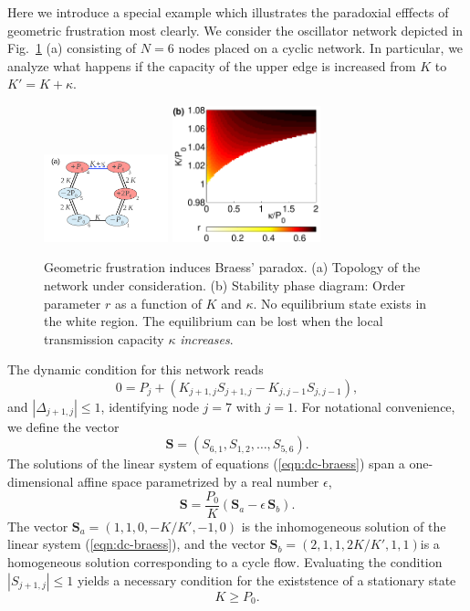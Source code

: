 \documentclass[10pt,aps,pre,preprint,superscriptaddress]{revtex4-1}
\newcommand{\be}{\begin{equation}}
\newcommand{\ee}{\end{equation}}
\renewcommand{\vec}[1]{\boldsymbol{#1}}
\begin{document}
Here we introduce a special example which illustrates the
paradoxial efffects of geometric frustration most clearly.
We consider the oscillator network depicted in Fig.~\ref{fig:braess} (a)
consisting of $N=6$ nodes placed on a cyclic network.
In particular, we analyze what happens if the capacity
of the upper edge is increased from $K$ to 
$K' = K + \kappa$. 


\begin{figure}[tb]
\centering
\includegraphics[width =3.6cm, angle=0]{pics/cycleex1_a}
\includegraphics[width=4.3cm, angle=0]{pics/braess_order3}
\caption{\label{fig:braess}
Geometric frustration induces Braess' paradox.
(a) Topology of the network under consideration.
(b) Stability phase diagram: Order parameter $r$ 
as a function of $K$ and $\kappa$. No equilibrium 
state exists in the white region. 
The equilibrium can be lost when the
local transmission capacity $\kappa$ 
\emph{increases}.
}
\end{figure}

The dynamic condition for this network reads
\be
   0 = P_j + ( K_{j+1,j} S_{j+1,j}  - K_{j,j-1} S_{j,j-1} ),
   \label{eqn:dc-braess}
\ee
and $|\Delta_{j+1,j}| \le 1$, identifying node $j=7$ with $j=1$.
 For notational convenience,
we define the vector 
\be
   \vec S = (S_{6,1} ,S_{1,2}, \ldots, S_{5,6} ).
\ee
The solutions of the linear system of equations (\ref{eqn:dc-braess}) 
span a one-dimensional affine space parametrized by a real 
number $\epsilon$,
\be
   \vec S = \frac{P_0}{K} 
      \left( \vec S_a - \epsilon \, \vec S_b \right).
   \label{eqn:SaSb2}
\ee
The vector $\vec S_a = (1,1,0,-K/K',-1, 0)$ is the 
inhomogeneous solution of the linear system (\ref{eqn:dc-braess}), 
and the vector $\vec S_b = (2,1,1,2K/K',1,1)$is a homogeneous 
solution corresponding to a cycle flow.
Evaluating the condition $|S_{j+1,j}| \le 1$ yields
a necessary condition for the existstence of a stationary state
\be
     K \ge P_0.
\ee
\end{document}
